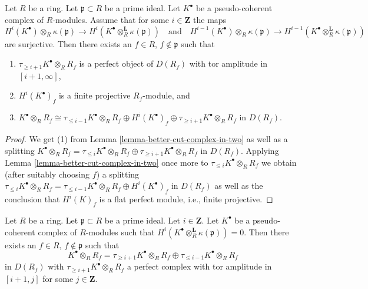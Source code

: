 \begin{lemma}
\label{lemma-isolate-a-cohomology-group}
Let $R$ be a ring. Let $\mathfrak p \subset R$ be a prime ideal.
Let $K^\bullet$ be a pseudo-coherent complex of $R$-modules.
Assume that for some $i \in \mathbf{Z}$ the maps
$$
H^i(K^\bullet) \otimes_R \kappa(\mathfrak p)
\longrightarrow
H^i(K^\bullet \otimes_R^{\mathbf{L}} \kappa(\mathfrak p))
\quad\text{and}\quad
H^{i - 1}(K^\bullet) \otimes_R \kappa(\mathfrak p)
\longrightarrow
H^{i - 1}(K^\bullet \otimes_R^{\mathbf{L}} \kappa(\mathfrak p))
$$
are surjective. Then there exists an $f \in R$, $f \not \in \mathfrak p$
such that
\begin{enumerate}
\item $\tau_{\geq i + 1}K^\bullet \otimes_R R_f$ is a perfect
object of $D(R_f)$ with tor amplitude in $[i + 1, \infty]$,
\item $H^i(K^\bullet)_f$ is a finite projective $R_f$-module, and\
\item $K^\bullet \otimes_R R_f \cong
\tau_{\leq i - 1}K^\bullet \otimes_R R_f \oplus H^i(K^\bullet)_f \oplus
\tau_{\geq i + 1}K^\bullet \otimes_R R_f$
in $D(R_f)$.
\end{enumerate}
\end{lemma}

\begin{proof}
We get (1) from Lemma \ref{lemma-better-cut-complex-in-two} as well
as a splitting
$K^\bullet \otimes_R R_f = \tau_{\leq i}K^\bullet \otimes_R R_f \oplus
\tau_{\geq i + 1}K^\bullet \otimes_R R_f$
in $D(R_f)$. Applying Lemma \ref{lemma-better-cut-complex-in-two} once
more to $\tau_{\leq i}K^\bullet \otimes_R R_f$
we obtain (after suitably choosing $f$) a splitting
$\tau_{\leq i}K^\bullet \otimes_R R_f =
\tau_{\leq i - 1}K^\bullet \otimes_R R_f \oplus H^i(K^\bullet)_f$ in $D(R_f)$
as well as the conclusion that $H^i(K)_f$ is a flat perfect module, i.e.,
finite projective.
\end{proof}

\begin{lemma}
\label{lemma-cut-complex-in-two}
Let $R$ be a ring. Let $\mathfrak p \subset R$ be a prime ideal.
Let $i \in \mathbf{Z}$. Let $K^\bullet$ be a pseudo-coherent complex
of $R$-modules such that
$H^i(K^\bullet \otimes_R^{\mathbf{L}} \kappa(\mathfrak p)) = 0$.
Then there exists an $f \in R$, $f \not \in \mathfrak p$ such that
$$
K^\bullet \otimes_R R_f =
\tau_{\geq i + 1}K^\bullet \otimes_R R_f \oplus
\tau_{\leq i - 1}K^\bullet \otimes_R R_f
$$
in $D(R_f)$ with $\tau_{\geq i + 1}K^\bullet \otimes_R R_f$ a perfect
complex with tor amplitude in $[i + 1, j]$ for some $j \in \mathbf{Z}$.
\end{lemma}

